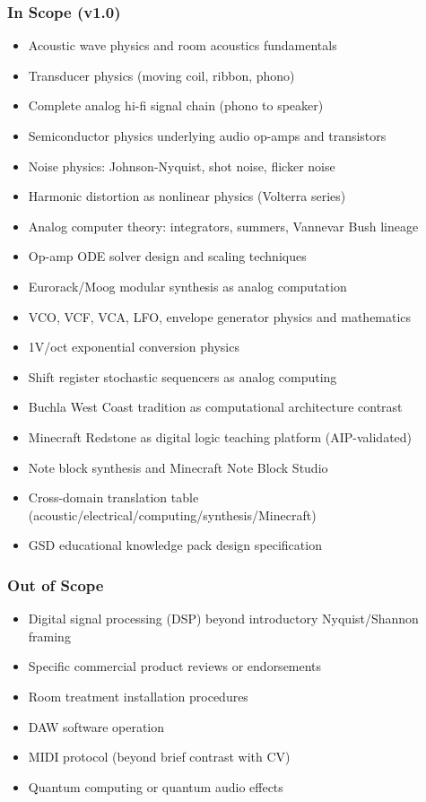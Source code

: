 \documentclass[11pt,letterpaper]{article}
\begin{document}
\subsubsection{In Scope (v1.0)}
\begin{itemize}[leftmargin=2em]
  \item Acoustic wave physics and room acoustics fundamentals
  \item Transducer physics (moving coil, ribbon, phono)
  \item Complete analog hi-fi signal chain (phono to speaker)
  \item Semiconductor physics underlying audio op-amps and transistors
  \item Noise physics: Johnson-Nyquist, shot noise, flicker noise
  \item Harmonic distortion as nonlinear physics (Volterra series)
  \item Analog computer theory: integrators, summers, Vannevar Bush lineage
  \item Op-amp ODE solver design and scaling techniques
  \item Eurorack/Moog modular synthesis as analog computation
  \item VCO, VCF, VCA, LFO, envelope generator physics and mathematics
  \item 1V/oct exponential conversion physics
  \item Shift register stochastic sequencers as analog computing
  \item Buchla West Coast tradition as computational architecture contrast
  \item Minecraft Redstone as digital logic teaching platform (AIP-validated)
  \item Note block synthesis and Minecraft Note Block Studio
  \item Cross-domain translation table (acoustic/electrical/computing/synthesis/Minecraft)
  \item GSD educational knowledge pack design specification
\end{itemize}

\subsubsection{Out of Scope}
\begin{itemize}[leftmargin=2em]
  \item Digital signal processing (DSP) beyond introductory Nyquist/Shannon framing
  \item Specific commercial product reviews or endorsements
  \item Room treatment installation procedures
  \item DAW software operation
  \item MIDI protocol (beyond brief contrast with CV)
  \item Quantum computing or quantum audio effects
\end{itemize}
\end{document}
